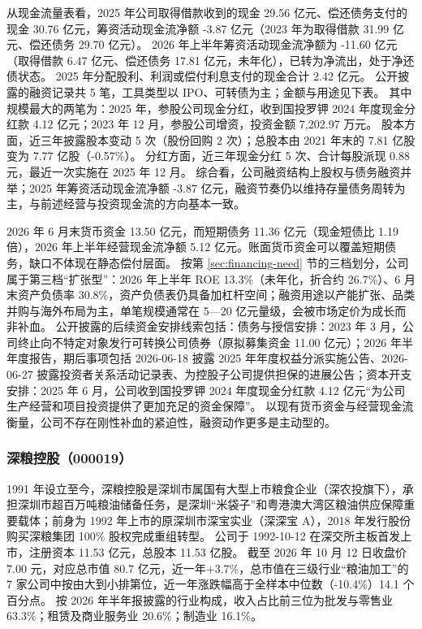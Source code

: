  从现金流量表看，2025 年公司取得借款收到的现金 29.56 亿元、偿还债务支付的现金 30.76 亿元，筹资活动现金流净额 -3.87 亿元（2023 年为取得借款 31.99 亿元、偿还债务 29.70 亿元）。 2026 年上半年筹资活动现金流净额为 -11.60 亿元（取得借款 6.47 亿元、偿还债务 17.81 亿元，未年化），已转为净流出，处于净还债状态。 2025 年分配股利、利润或偿付利息支付的现金合计 2.42 亿元。 公开披露的融资记录共 5 笔，工具类型以 IPO、可转债为主；金额与用途见下表。 其中规模最大的两笔为：2025 年，参股公司现金分红，收到国投罗钾 2024 年度现金分红款 4.12 亿元；2023 年 12 月，参股公司增资，投资金额 7,202.97 万元。 股本方面，近三年披露股本变动 5 次（股份回购 2 次）；总股本由 2021 年末的 7.81 亿股变为 7.77 亿股（-0.57\%）。 分红方面，近三年现金分红 5 次、合计每股派现 0.88 元，最近一次实施在 2025 年 12 月。 综合看，公司融资结构上股权与债务融资并举；2025 年筹资活动现金流净额 -3.87 亿元，融资节奏仍以维持存量债务周转为主，与前述经营与投资现金流的方向基本一致。

 2026 年 6 月末货币资金 13.50 亿元，而短期债务 11.36 亿元（现金短债比 1.19 倍），2026 年上半年经营现金流净额 5.12 亿元。账面货币资金可以覆盖短期债务，缺口不体现在静态偿付层面。 按第 \ref{sec:financing-need} 节的三档划分，公司属于第三档“扩张型”：2026 年上半年 ROE 13.3\%（未年化，折合约 26.7\%）、6 月末资产负债率 30.8\%，资产负债表仍具备加杠杆空间；融资用途以产能扩张、品类并购与海外布局为主，单笔规模通常在 5---20 亿元量级，会被市场定价为成长而非补血。 公开披露的后续资金安排线索包括：债务与授信安排：2023 年 3 月，公司终止向不特定对象发行可转换公司债券（原拟募集资金 11.00 亿元）；2026 年半年度报告，期后事项包括 2026-06-18 披露 2025 年年度权益分派实施公告、2026-06-27 披露投资者关系活动记录表、为控股子公司提供担保的进展公告；资本开支安排：2025 年 6 月，公司收到国投罗钾 2024 年度现金分红款 4.12 亿元“为公司生产经营和项目投资提供了更加充足的资金保障”。 以现有货币资金与经营现金流衡量，公司不存在刚性补血的紧迫性，融资动作更多是主动型的。




\subsubsection{深粮控股（000019）}
\label{co:000019}

 1991 年设立至今，深粮控股是深圳市属国有大型上市粮食企业（深农投旗下），承担深圳市超百万吨粮油储备任务，是深圳“米袋子”和粤港澳大湾区粮油供应保障重要载体；前身为 1992 年上市的原深圳市深宝实业（深深宝 A），2018 年发行股份购买深粮集团 100\% 股权完成重组转型。 公司于 1992-10-12 在深交所主板首发上市，注册资本 11.53 亿元，总股本 11.53 亿股。 截至 2026 年 10 月 12 日收盘价 7.00 元，对应总市值 80.7 亿元，近一年+3.7\%，总市值在三级行业“粮油加工”的 7 家公司中按由大到小排第位，近一年涨跌幅高于全样本中位数（-10.4\%）14.1 个百分点。 按 2026 年半年报披露的行业构成，收入占比前三位为批发与零售业 63.3\%；租赁及商业服务业 20.6\%；制造业 16.1\%。

